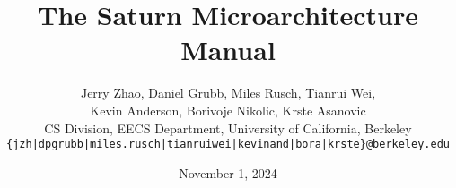 \documentclass[titlepage]{article}
\begin{document}
\title{\textbf{The Saturn Microarchitecture Manual}}
\author{Jerry Zhao, Daniel Grubb, Miles Rusch, Tianrui Wei, \\
  Kevin Anderson, Borivoje Nikolic, Krste Asanovic \\
  CS Division, EECS Department, University of California, Berkeley \\
  \texttt{\{jzh|dpgrubb|miles.rusch|tianruiwei|kevinand|bora|krste\}@berkeley.edu}}
\date{November 1, 2024}

\maketitle

\setcounter{tocdepth}{2}
\tableofcontents

\newpage










\newpage

\newpage

\end{document}
